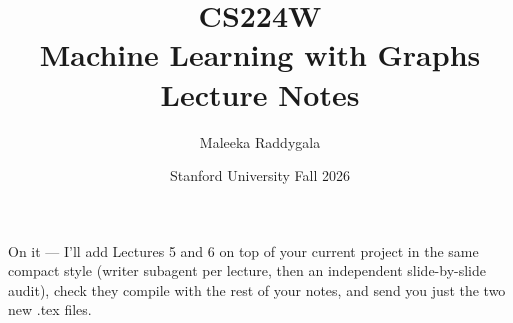 \documentclass[11pt,oneside]{report}
\title{%
  \vspace*{-2cm}
  {\Huge\sffamily\bfseries CS224W}\\[6pt]
  {\LARGE\sffamily Machine Learning with Graphs}\\[14pt]
  {\large Lecture Notes}}
\author{Maleeka Raddygala}
\date{Stanford University \textbullet{} Fall 2026}
\begin{document}
\maketitle
\thispagestyle{empty}
\tableofcontents
On it — I’ll add Lectures 5 and 6 on top of your current project in the same compact style (writer subagent per lecture, then an independent slide-by-slide audit), check they compile with the rest of your notes, and send you just the two new .tex files.















% 

\appendix

\end{document}
